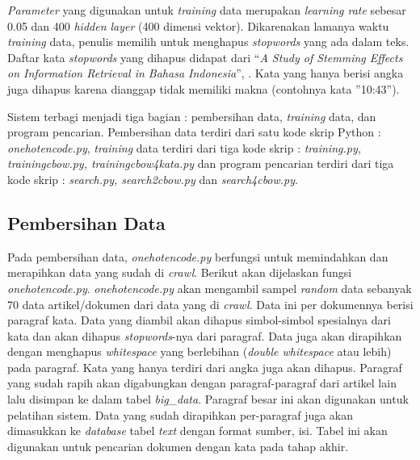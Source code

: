 \documentclass[12pt]{report}
\begin{document}
\textit{Parameter} yang digunakan untuk \textit{training} data merupakan \textit{learning rate} sebesar 0.05 dan 400 \textit{hidden layer} (400 dimensi vektor). Dikarenakan lamanya waktu \textit{training} data, penulis memilih untuk menghapus \textit{stopwords} yang ada dalam teks. Daftar kata \textit{stopwords} yang dihapus didapat dari ``\textit{A Study of Stemming Effects on Information Retrieval in Bahasa Indonesia}'', . Kata yang hanya berisi angka juga dihapus karena dianggap tidak memiliki makna (contohnya kata ''10:43'').

Sistem terbagi menjadi tiga bagian : pembersihan data, \textit{training} data, dan program pencarian. Pembersihan data terdiri dari satu kode skrip Python : \textit{onehotencode.py}, \textit{training} data terdiri dari tiga kode skrip : \textit{training.py, trainingcbow.py, trainingcbow4kata.py} dan program pencarian terdiri dari tiga kode skrip : \textit{search.py, search2cbow.py} dan \textit{search4cbow.py}.

\subsection{Pembersihan Data}
Pada pembersihan data, \textit{onehotencode.py} berfungsi untuk memindahkan dan merapihkan data yang sudah di \textit{crawl}. Berikut akan dijelaskan fungsi \textit{onehotencode.py}. \textit{onehotencode.py} akan mengambil sampel \textit{random} data sebanyak 70 data artikel/dokumen dari data yang di \textit{crawl}. Data ini per dokumennya berisi paragraf kata. Data yang diambil akan dihapus simbol-simbol spesialnya dari kata dan akan dihapus \textit{stopwords}-nya dari paragraf. Data juga akan dirapihkan dengan menghapus \textit{whitespace} yang berlebihan (\textit{double whitespace} atau lebih) pada paragraf. Kata yang hanya terdiri dari angka juga akan dihapus. Paragraf yang sudah rapih akan digabungkan dengan paragraf-paragraf dari artikel lain lalu disimpan ke dalam tabel \textit{big\_data}. Paragraf besar ini akan digunakan untuk pelatihan sistem. Data yang sudah dirapihkan per-paragraf juga akan dimasukkan ke \textit{database} tabel \textit{text} dengan format sumber, isi. Tabel ini akan digunakan untuk pencarian dokumen dengan kata pada tahap akhir.
\end{document}

